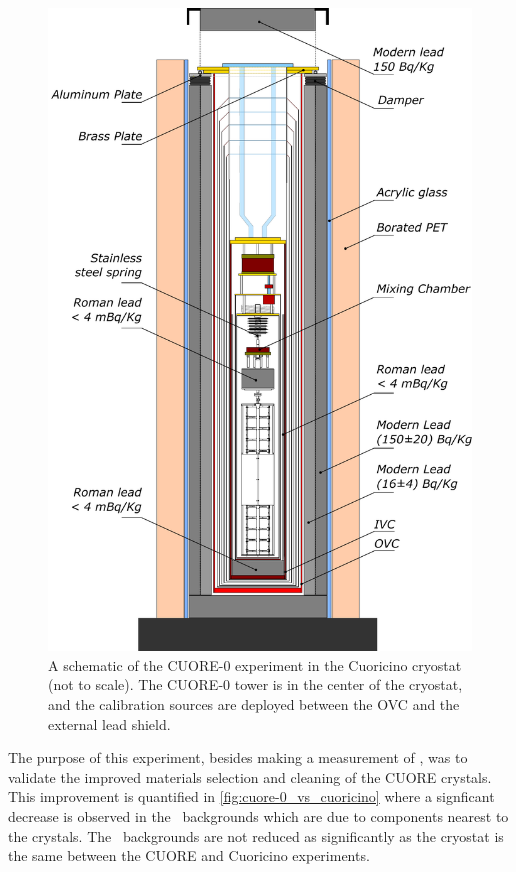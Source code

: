 \begin{figure} [htbp]
    \centering
    \includegraphics[width=0.8\linewidth]{Figures/CUORE-0_cryostat_schematic.pdf}
    \caption[A schematic of the CUORE-0 experiment]
    {A schematic of the CUORE-0 experiment in the Cuoricino cryostat (not to scale).
    The CUORE-0 tower is in the center of the cryostat, and the calibration sources are deployed between the OVC and the external lead shield.}
    \label{fig:CUORE-0_cryostat_schematic}
\end{figure}

The purpose of this experiment, besides making a measurement of \zeronubb, was to validate the improved materials selection and cleaning of the CUORE crystals.
This improvement is quantified in \autoref{fig:cuore-0_vs_cuoricino} where a signficant decrease is observed in the \alpha~backgrounds which are due to components nearest to the crystals.
The \gamma~backgrounds are not reduced as significantly as the cryostat is the same between the CUORE and Cuoricino experiments.

